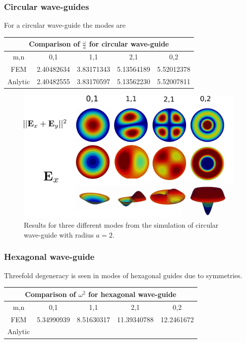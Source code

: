 \subsubsection{Circular wave-guides}

For a circular wave-guide the modes are 

\begin{center}
\begin{tabular}{|c|c|c|c|c|}
\hline
\multicolumn{5}{|c|}{Comparison of $\frac{\omega}{a}$ for circular wave-guide} \\
\hline 
m,n & 0,1 & 1,1 & 2,1 & 0,2 \\ 
\hline 
FEM     & 2.40482634 & 3.83171343 & 5.13564189 & 5.52012378 \\ 
\hline 
Anlytic & 2.40482555 & 3.83170597 & 5.13562230 & 5.52007811 \\ 
\hline 
\end{tabular} 
\label{tab:cir_wav_comparison}
\end{center}

\begin{figure}
\centering
\includegraphics[scale=0.1]{./img/circular_waveguide.pdf}
\caption{Results for three different modes from the simulation of circular wave-guide with radius $a=2$.}
\label{fig:circular_waveguide}
\end{figure}

\subsubsection{Hexagonal wave-guide}

Threefold degeneracy is seen in modes of hexagonal guides due to symmetries.

\begin{center}
\begin{tabular}{|c|c|c|c|c|}
\hline
\multicolumn{5}{|c|}{Comparison of $\omega^2$ for hexagonal wave-guide} \\
\hline 
m,n & 0,1 & 1,1 & 2,1 & 0,2 \\ 
\hline 
FEM     & 5.34990939 & 8.51630317 & 11.39340788 & 12.2461672 \\ 
\hline 
Anlytic &  &  &  &  \\ 
\hline 
\end{tabular} 
\label{tab:hex_wav_comparison}
\end{center}

